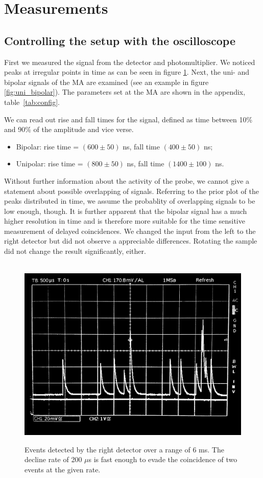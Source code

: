\section{Measurements}
\label{sec:measurements}

\subsection{Controlling the setup with the oscilloscope}
\label{ssub:Controlling the setup with the oscilloscope}
First we measured the signal from the detector and photomultiplier. We noticed peaks at irregular points in time 
as can be seen in figure \ref{fig:osci_signal}. Next, the uni- and bipolar signals of the MA are 
examined (see an example in figure \ref{fig:uni_bipolar}). 
The parameters set at the MA are shown in the appendix, table~\ref{tab:config}. 

We can read out rise and fall times for the signal, 
defined as time between 10\% and 90\% of the amplitude and vice verse. 
\begin{itemize}
    \item
        Bipolar:    rise time = $(600 \pm 50)$ ns, fall time $(400 \pm 50)$ ns;
    \item
        Unipolar:   rise time = $(800 \pm 50)$ ns, fall time $(1400 \pm 100)$ ns.
\end{itemize}
Without further information about the activity of the probe, we cannot give a statement about 
possible overlapping of signals. Referring to the prior plot of the peaks distributed in time, we 
assume the probablity of overlapping signals to be low enough, though. 
It is further apparent that the bipolar signal has a much higher resolution in time and is therefore 
more suitable for the time sensitive measurement of delayed coincidences. 
We changed the input from the left to the right detector but did not observe a appreciable differences.
Rotating the sample did not change the result significantly, either.  
\\\\
\begin{figure}
    \begin{centering}
        \caption{
            Events detected by the right detector over a range of 6 ms. 
            The decline rate of 200 $\mu$s is fast enough to evade the 
            coincidence of two events at the given rate. 
            }
        \includegraphics[width=0.45\linewidth]{figures/osci_signal}
        \label{fig:osci_signal}
    \end{centering}
\end{figure}

